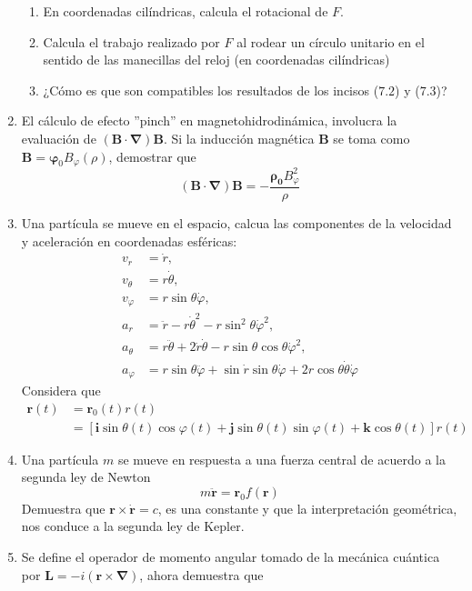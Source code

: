\documentclass[12pt]{article}
\begin{document}
\begin{enumerate}
\begin{enumerate}
\item En coordenadas cilíndricas, calcula el rotacional de $F$. \label{2}
\item Calcula el trabajo realizado por $F$ al rodear un círculo unitario en el sentido de las manecillas del reloj (en coordenadas cilíndricas) \label{3}
\item ¿Cómo es que son compatibles los resultados de los incisos ($7.2$) y ($7.3$)? 
\end{enumerate}
\item El cálculo de efecto ''pinch'' en magnetohidrodinámica, involucra la evaluación de $(\mathbf{B} \cdot \bm{\nabla}) \mathbf{B}$. Si la inducción magnética $\mathbf{B}$ se toma como $\mathbf{B} = \bm{\varphi}_{0} B_{\varphi} (\rho)$, demostrar que
\[ (\mathbf{B} \cdot \bm{\nabla}) \mathbf{B} = - \dfrac{\bm{\rho_{0}} B_{\varphi}^{2}}{\rho}	 \]
\item Una partícula se mueve en el espacio, calcua las componentes de la velocidad y aceleración en coordenadas esféricas:
\[ \begin{split}
v_{r} &= \dot{r}, \\
v_{\theta} &= r \dot{\theta}, \\
v_{\varphi} &= r \sin \theta \dot{\varphi}, \\
a_{r} &= \ddot{r} - r \dot{\theta}^{2} - r \sin^{2} \theta \dot{\varphi}^{2}, \\
a_{\theta} &= r \ddot{\theta} + 2 \dot{r} \dot{\theta} - r \sin \theta \cos \theta \dot{\varphi}^{2}, \\
a_{\varphi} &= r \sin \theta \ddot{\varphi} + \sin \dot{r} \sin \theta \dot{\varphi} + 2 r \cos \theta \dot{\theta} \dot{\varphi}
\end{split} \]
Considera que
\[ \begin{split}
\mathbf{r}(t) &= \mathbf{r}_{0}(t) r(t) \\
&= [ \mathbf{i} \sin \theta (t) \cos \varphi (t) + \mathbf{j} \sin \theta (t) \sin \varphi (t) + \mathbf{k} \cos \theta (t) ] r(t)
\end{split} \]
\item Una partícula $m$ se mueve en respuesta a una fuerza central de acuerdo a la segunda ley de Newton
\[ m \mathbf{\ddot{r}} =  \mathbf{r}_{0} f(\mathbf{r}) \]
Demuestra que $\mathbf{r} \times \mathbf{\dot{r}} =  c$, es una constante y que la interpretación geométrica, nos conduce a la segunda ley de Kepler.
\item Se define el operador de momento angular tomado de la mecánica cuántica por $\mathbf{L} =  -i (\mathbf{r} \times \bm{\nabla})$, ahora demuestra que

\end{enumerate}
\end{document}
